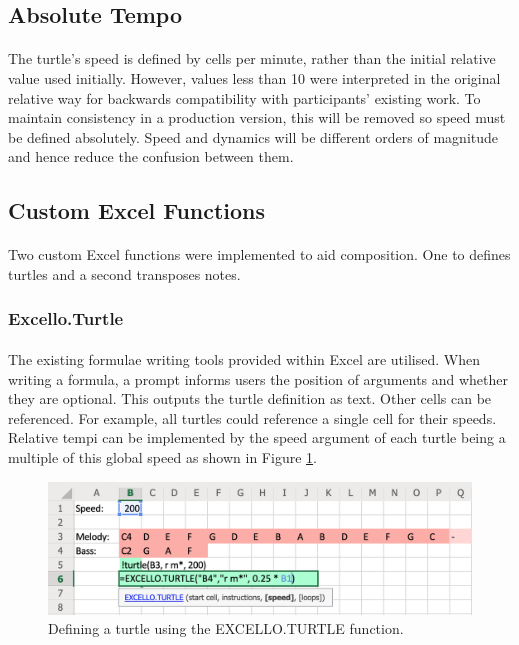 \subsection{Absolute Tempo}

\paragraph{} The turtle's speed is defined by cells per minute, rather than the initial relative value used initially. However, values less than 10 were interpreted in the original relative way for backwards compatibility with participants' existing work. To maintain consistency in a production version, this will be removed so speed must be defined absolutely. Speed and dynamics will be different orders of magnitude and hence reduce the confusion between them.

\subsection{Custom Excel Functions}

\paragraph{} Two custom Excel functions were implemented to aid composition. One to defines turtles and a second transposes notes.

\subsubsection{Excello.Turtle}

\paragraph{} The existing formulae writing tools provided within Excel are utilised. When writing a formula, a prompt informs users the position of arguments and whether they are optional. This outputs the turtle definition as text. Other cells can be referenced. For example, all turtles could reference a single cell for their speeds. Relative tempi can be implemented by the speed argument of each turtle being a multiple of this global speed as shown in Figure \ref{implementation:turtleFunction}.

\begin{figure}[tbh]
\centerline{\includegraphics[width=150mm]{figs/turtleFunction.png}}
\caption{Defining a turtle using the EXCELLO.TURTLE function.}
\label{implementation:turtleFunction}
\end{figure}

